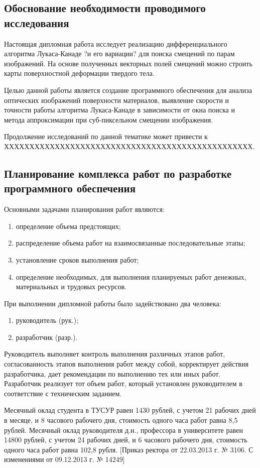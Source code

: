 \subsection{Обоснование необходимости проводимого исследования}

Настоящая дипломная работа исследует реализацию дифференциального алгоритма Лукаса-Канаде ?и его вариации? для поиска смещений по парам изображений. На основе полученных векторных полей смещений можно строить карты поверхностной деформации твердого тела. 

Целью данной работы является создание программного обеспечения для анализа оптических изображений поверхности материалов, выявление скорости и точности работы алгоритма Лукаса-Канаде в зависимости от окна поиска и метода аппроксимации при суб-пиксельном смещении изображения.

Продолжение исследований по данной тематике может привести к ХХХХХХХХХХХХХХХХХХХХХХХХХХХХХХХХХХХХХХХХХХХХХХХХХ.
\subsection{Планирование комплекса работ по разработке программного обеспечения}
Основными задачами планирования работ являются:
\begin{enumerate}
\item определение объема предстоящих;
\item распределение объема работ на взаимосвязанные последовательные этапы;
\item установление сроков выполнения работ;
\item определение необходимых, для выполнения планируемых работ денежных, материальных и трудовых ресурсов.
\end{enumerate}
При выполнении дипломной работы было задействовано два человека:
\begin{enumerate}
\item руководитель (рук.);
\item разработчик (разр.).
\end{enumerate}
Руководитель выполняет контроль выполнения различных этапов работ, согласованность этапов выполнения работ между собой, корректирует действия разработчика, дает рекомендации по выполнению тех или иных работ. Разработчик реализует тот объем работ, который установлен руководителем в соответствие с техническим заданием.

Месячный оклад студента в ТУСУР равен 1430 рублей, с учетом 21 рабочих дней в месяце, и 8 часового рабочего дня, стоимость одного часа работ равна 8,5 рублей. Месячный оклад руководителя д.н., профессора в университете равен 14800 рублей, с учетом 24 рабочих дней, и 6 часового рабочего дня, стоимость одного часа работ равна 102,8 рубля. [Приказ ректора от 22.03.2013 г. № 3106. С изменениями от 09.12.2013 г. № 14249]

